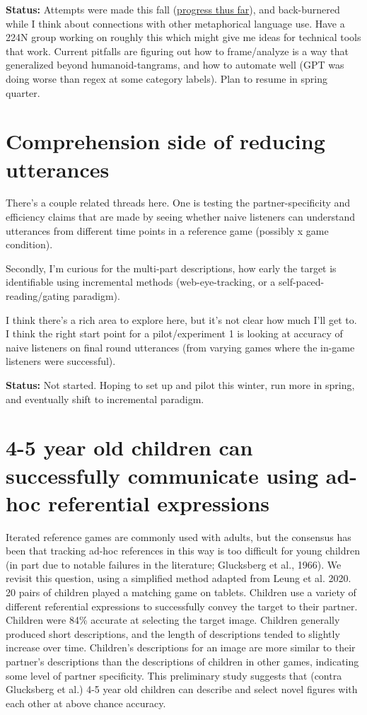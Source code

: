 \documentclass[]{article}
\begin{document}
\textbf{Status:} Attempts were made this fall (\href{https://rpubs.com/vboyce/tggpt1}{progress thus far}), and back-burnered while I think about connections with other metaphorical language use. Have a 224N group working on roughly this which might give me ideas for technical tools that work. 
Current pitfalls are figuring out how to frame/analyze is a way that generalized beyond humanoid-tangrams, and how to automate well (GPT was doing worse than regex at some category labels). Plan to resume in spring quarter. 

\section{Comprehension side of reducing utterances}
There's a couple related threads here. One is testing the partner-specificity and efficiency claims that are made by seeing whether naive listeners can understand utterances from different time points in a reference game (possibly x game condition). 

Secondly, I'm curious for the multi-part descriptions, how early the target is identifiable using incremental methods (web-eye-tracking, or a self-paced-reading/gating paradigm). 

I think there's a rich area to explore here, but it's not clear how much I'll get to. I think the right start point for a pilot/experiment 1 is looking at accuracy of naive listeners on final round utterances (from varying games where the in-game listeners were successful). 

\textbf{Status:} Not started. Hoping to set up and pilot this winter, run more in spring, and eventually shift to incremental paradigm. 

\section{4-5 year old children can successfully communicate using ad-hoc referential expressions}
Iterated reference games are commonly used with adults, but the consensus has been that tracking ad-hoc references in this way is too difficult for young children (in part due to notable failures in the literature; Glucksberg et al., 1966). We revisit this question, using a simplified method adapted from Leung et al. 2020. 20 pairs of children played a matching game on tablets. Children use a variety of different referential expressions to successfully convey the target to their partner. Children were 84\% accurate at selecting the target image. Children generally produced short descriptions, and the length of descriptions tended to slightly increase over time. Children's descriptions for an image are more similar to their partner's descriptions than the descriptions of children in other games, indicating some level of partner specificity. This preliminary study suggests that (contra Glucksberg et al.) 4-5 year old children can describe and select novel figures with each other at above chance accuracy.
\end{document}
